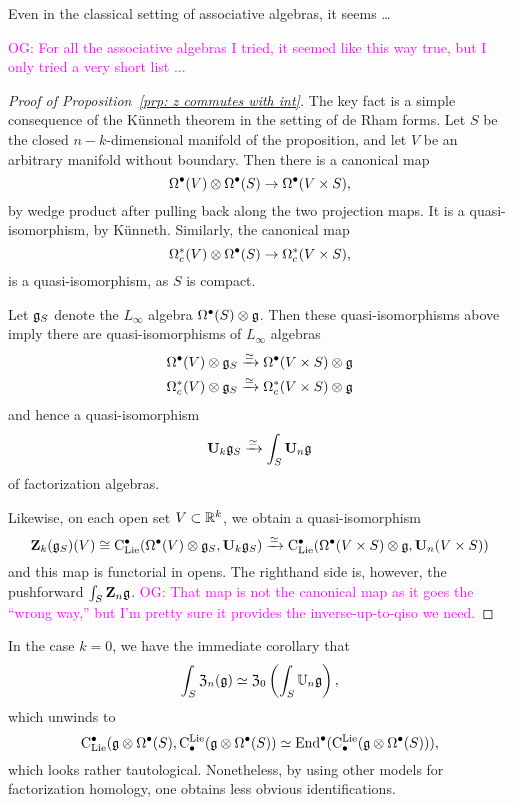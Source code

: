 \documentclass[11pt]{amsart}
\numberwithin{equation}{section}
\def\owen{\textcolor{magenta}{OG: }\textcolor{magenta}}
\begin{document}
Even in the classical setting of associative algebras, it seems \dots

\owen{For all the associative algebras I tried, it seemed like this way true, but I only tried a very short list ...}

\begin{proof}[Proof of Proposition~\ref{prp: z commutes with int}]
The key fact is a simple consequence of the K\"unneth theorem in the setting of de Rham forms.
Let $S$ be the closed $n-k$-dimensional manifold of the proposition,
and let $V$ be an arbitrary manifold without boundary.
Then there is a canonical map
\[
\Omega^\bullet(V) \otimes \Omega^\bullet(S) \to \Omega^\bullet(V \times S),
\]
by wedge product after pulling back along the two projection maps.
It is a quasi-isomorphism, by K\"unneth.
Similarly, the canonical map
\[
\Omega_c^*(V) \otimes \Omega^\bullet(S) \to \Omega_c^*(V \times S),
\]
is a quasi-isomorphism, as $S$ is compact.

Let $\mathfrak g_S$ denote the $L_\infty$ algebra $\Omega^\bullet(S) \otimes \mathfrak g$. 
Then these quasi-isomorphisms above imply there are quasi-isomorphisms of $L_\infty$ algebras
\begin{align*}
\Omega^\bullet(V) \otimes \mathfrak g_S &\xrightarrow{\simeq} \Omega^\bullet(V \times S) \otimes \mathfrak g \\
\Omega_c^*(V) \otimes \mathfrak g_S &\xrightarrow{\simeq} \Omega_c^*(V \times S) \otimes \mathfrak g 
\end{align*}
and hence a quasi-isomorphism
\[
\mathbf U_k \mathfrak g_S \xrightarrow{\simeq} \int_S \mathbf U_n \mathfrak g
\]
of factorization algebras.

Likewise, on each open set $V \subset \mathbb R^k$, 
we obtain a quasi-isomorphism
\[
\mathbf Z_k(\mathfrak g_S)(V) \cong {\rm C}_{\rm Lie}^\bullet( \Omega^\bullet(V) \otimes \mathfrak g_S, \mathbf U_k \mathfrak g_S) \xrightarrow{\simeq} {\rm C}_{\rm Lie}^\bullet(\Omega^\bullet(V \times S) \otimes \mathfrak g, \mathbf U_n(V \times S))
\]
and this map is functorial in opens.
The righthand side is, however, the pushforward $\int_S \mathbf Z_n \mathfrak g$.
\owen{That map is not the canonical map as it goes the ``wrong way,'' but I'm pretty sure it provides the inverse-up-to-qiso we need.}
\end{proof}

In the case $k = 0$, we have the immediate corollary that
\[
\int_{S} \mathfrak Z_n(\mathfrak g) \simeq \mathfrak Z_0 \left( \int_S \mathbb U_n \mathfrak g \right) ,
\]
which unwinds to 
\begin{equation}
\label{eqn: taut}
{\rm C}_{\rm Lie}^\bullet(\mathfrak g \otimes \Omega^\bullet(S), {\rm C}^{\rm Lie}_\bullet(\mathfrak g \otimes \Omega^\bullet(S)) \simeq {\rm End}^\bullet({\rm C}^{\rm Lie}_\bullet(\mathfrak g \otimes \Omega^\bullet(S))),
\end{equation}
which looks rather tautological.
Nonetheless, by using other models for factorization homology,
one obtains less obvious identifications.
\end{document}
